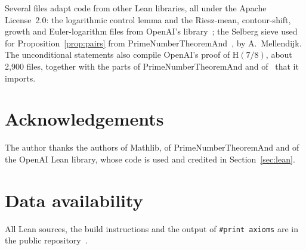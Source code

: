 \documentclass[11pt]{amsart}
\theoremstyle{definition}
\theoremstyle{remark}
\numberwithin{equation}{section}
\begin{document}
Several files adapt code from other Lean libraries, all under the Apache
License~2.0: the logarithmic control lemma and the Riesz-mean, contour-shift,
growth and Euler-logarithm files from OpenAI's library~\cite{openai}; the
Selberg sieve used for Proposition~\ref{prop:pairs} from
PrimeNumberTheoremAnd~\cite{pnt}, by A.~Mellendijk. The unconditional statements
also compile OpenAI's proof of $\mathrm H(7/8)$, about 2,900 files, together with
the parts of PrimeNumberTheoremAnd and of~\cite{rk} that it imports.

\section*{Acknowledgements}
The author thanks the authors of Mathlib, of PrimeNumberTheoremAnd and of the
OpenAI Lean library, whose code is used and credited in Section~\ref{sec:lean}.

\section*{Data availability}
All Lean sources, the build instructions and the output of \texttt{\#print
axioms} are in the public repository~\cite{repo}.



\end{document}
